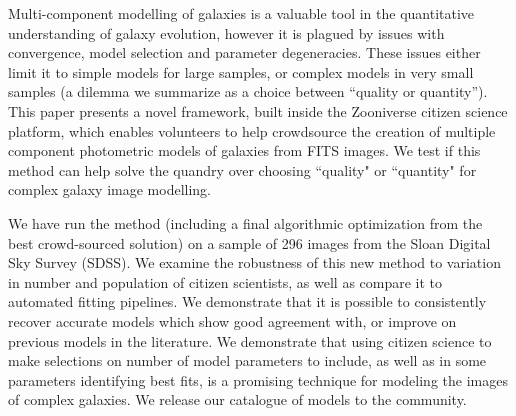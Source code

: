 \documentclass[../main.tex]{subfiles}
\begin{document}
Multi-component modelling of galaxies is a valuable tool in the quantitative understanding of galaxy evolution, however it is plagued by issues with convergence, model selection and parameter degeneracies. These issues either limit it to simple models for large samples, or complex models in very small samples  (a dilemma we summarize as a choice between “quality or quantity”). This paper presents a novel framework, built inside the Zooniverse citizen science platform, which enables volunteers to help crowdsource the creation of multiple component photometric models of galaxies from FITS images. We test if this method can help solve the quandry over choosing ``quality" or ``quantity" for complex galaxy image modelling.

We have run the method (including a final algorithmic optimization from the best crowd-sourced solution) on a sample of 296 images from the Sloan Digital Sky Survey (SDSS). We examine the robustness of this new method to variation in number and population of citizen scientists, as well as compare it to automated fitting pipelines. We demonstrate that it is possible to consistently recover accurate models which show good agreement with, or improve on previous models in the literature. We demonstrate that using citizen science to make selections on number of model parameters to include, as well as in some parameters identifying best fits, is a promising technique for modeling the images of complex galaxies. We release our catalogue of models to the community.
\end{document}
